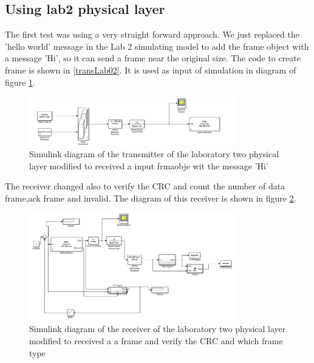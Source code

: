 \subsection{Using lab2 physical layer}
The first test was using a very straight forward approach. We just replaced the 'hello world' message in the Lab 2 
simulating model to add the frame object with a message 'Hi', so it can send a frame near the original size.
The code to create frame is shown in \ref{transLab02}. It is used as input of simulation in diagram of figure \ref{fig:trasmitter_lab02}.


\begin{figure}[ht]
    \centering
    \includegraphics[width=0.8\textwidth]{trasmitter_lab02.PNG}
    \caption{Simulink diagram of the transmitter of the laboratory two physical layer modified to received a input frmaobje wit the message 'Hi' }
    \label{fig:trasmitter_lab02}
\end{figure}

The receiver changed also to verify the CRC and count the number of data frame,ack frame and invalid. The diagram of this receiver is
shown in figure \ref{fig:receiver_lab02}.

\begin{figure}[ht]
    \centering
    \includegraphics[width=0.8\textwidth]{receiver_lab02.PNG}
    \caption{Simulink diagram of the receiver of the laboratory two physical layer modified to received a a frame and verify the CRC and which frame type }
    \label{fig:receiver_lab02}
\end{figure}


